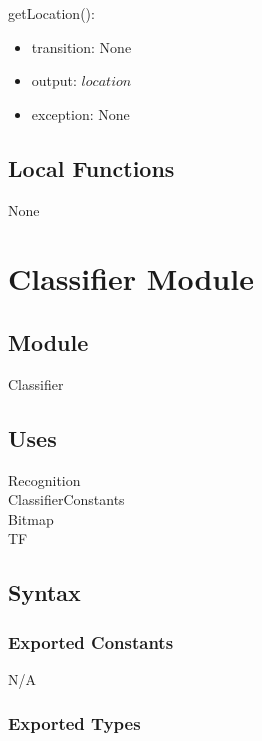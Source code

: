 \documentclass[12pt, titlepage]{article}
\begin{document}
\noindent getLocation():
\begin{itemize}
\item transition: None\\
\item output: $location$\\
\item exception: None\\

\end{itemize}

\subsection*{Local Functions}

None

\medskip
\medskip


\newpage

\section* {Classifier Module}

\subsection*{Module}

Classifier

\subsection* {Uses}

Recognition  \\
ClassifierConstants \\
Bitmap \\
TF \\

\subsection* {Syntax}

\subsubsection* {Exported Constants}

N/A

\subsubsection* {Exported Types}
\end{document}

